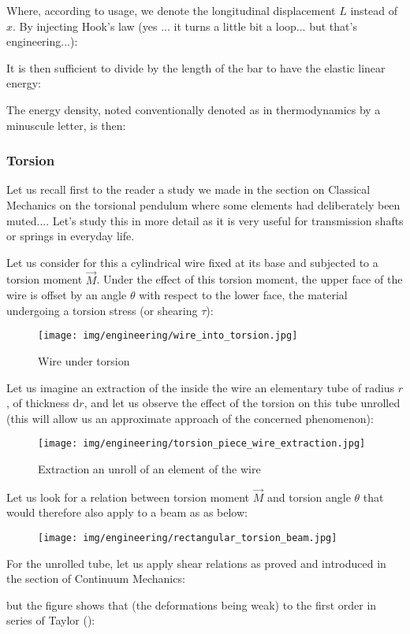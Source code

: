 	Where, according to usage, we denote the longitudinal displacement $L$ instead of $x$. By injecting Hook's law (yes ... it turns a little bit a loop... but that's engineering...):
	
	It is then sufficient to divide by the length of the bar to have the elastic linear energy:
	
	The energy density, noted conventionally denoted as in thermodynamics by a minuscule letter, is then:
	
	
	\pagebreak
	\subsubsection{Torsion}
	Let us recall first to the reader a study we made in the section on Classical Mechanics on the torsional pendulum where some elements had deliberately been muted.... Let's study this in more detail as it is very useful for transmission shafts or springs in everyday life.

	Let us consider for this a cylindrical wire fixed at its base and subjected to a torsion moment $\vec{M}$. Under the effect of this torsion moment, the upper face of the wire is offset by an angle $\theta$ with respect to the lower face, the material undergoing a torsion stress (or shearing $\tau$):
	\begin{figure}[H]
		\centering
		\texttt{[image: img/engineering/wire\_into\_torsion.jpg]}
		\caption{Wire under torsion}
	\end{figure}
	Let us imagine an extraction of the inside the wire an elementary tube of radius $r$, of thickness $\mathrm{d}r$, and let us observe the effect of the torsion on this tube unrolled (this will allow us an approximate approach of the concerned phenomenon):
	\begin{figure}[H]
		\centering
		\texttt{[image: img/engineering/torsion\_piece\_wire\_extraction.jpg]}
		\caption[]{Extraction an unroll of an element of the wire}
	\end{figure}
	Let us look for a relation between torsion moment $\vec{M}$ and torsion angle $\theta$ that would therefore also apply to a beam as as below:
	\begin{figure}[H]
		\centering
		\texttt{[image: img/engineering/rectangular\_torsion\_beam.jpg]}
	\end{figure}
	For the unrolled tube, let us apply shear relations as proved and introduced in the section of Continuum Mechanics:
	
	but the figure shows that (the deformations being weak) to the first order in series of Taylor ():
	
